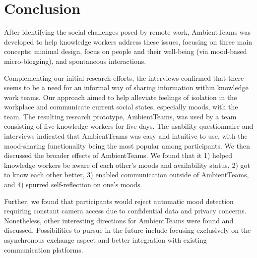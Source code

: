 \chapter{Conclusion}
\label{chapter:conclusion}
After identifying the social challenges posed by remote work, AmbientTeams was developed to help knowledge workers address these issues, focusing on three main concepts: minimal design, focus on people and their well-being (via mood-based micro-blogging), and spontaneous interactions.

Complementing our initial research efforts, the interviews confirmed that there seems to be a need for an informal way of sharing information within knowledge work teams. Our approach aimed to help alleviate feelings of isolation in the workplace and communicate current social states, especially moods, with the team. The resulting research prototype, AmbientTeams, was used by a team consisting of five knowledge workers for five days. The usability questionnaire and interviews indicated that AmbientTeams was easy and intuitive to use, with the mood-sharing functionality being the most popular among participants. We then discussed the broader effects of AmbientTeams. We found that it 1) helped knowledge workers be aware of each other's moods and availability status, 2) got to know each other better, 3) enabled communication outside of AmbientTeams, and 4) spurred self-reflection on one's moods.

Further, we found that participants would reject automatic mood detection requiring constant camera access due to confidential data and privacy concerns. Nonetheless, other interesting directions for AmbientTeams were found and discussed. Possibilities to pursue in the future include focusing exclusively on the asynchronous exchange aspect and better integration with existing communication platforms.